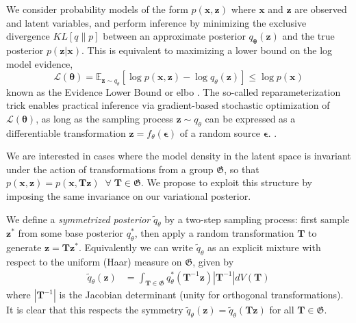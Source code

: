 \documentclass{article}
\newcommand{\E}{\mathbb{E}}
\newcommand{\G}{\mathfrak{G}}
\renewcommand{\v}[1]{\mathbf{#1}}
\newcommand{\elbo}{{\sc elbo}}
\begin{document}
We consider probability models of the form $p(\v{x}, \v{z})$ where $\v{x}$ and
$\v{z}$ are observed and latent variables, and perform
inference by minimizing the exclusive divergence $KL[q \| p]$
between an approximate posterior $q_{\v{\theta}}(\v{z})$ and the true
posterior $p(\v{z}|\v{x})$. This is equivalent to maximizing a lower
bound on the log model evidence,
\begin{equation}
\mathcal{L}(\v{\theta})\label{eqn:elbo} = \E_{\v{z}\sim q_\theta}\left[\log p(\v{x}, \v{z}) -
                \log q_\theta(\v{z})\right] \le \log p(\v{x}) 
\end{equation}
known as the Evidence Lower Bound or \elbo \; \citep{bishop2006pattern}. 
The so-called reparameterization trick enables practical inference via
gradient-based stochastic optimization of $\mathcal{L}(\v{\theta})$, as
long as the sampling process $\v{z}\sim q_\theta$ can be expressed as
a differentiable transformation $\v{z} = f_\theta(\v{\epsilon})$ of a random
source $\v{\epsilon}$. \citep{kingma2013auto, kucukelbir2016automatic}. 

We are interested in cases where the model density in the latent space is invariant under
the action of transformations from a group $\G$, so that 
$p(\v{x}, \v{z}) = p(\v{x}, \v{T}\v{z}) \;\; \forall \; \v{T} \in
\G.$
We propose to exploit this structure by imposing the same invariance
on our variational posterior. 

We define a {\em symmetrized
  posterior} $\tilde{q}_{\theta}$ by a two-step sampling
process: first sample $\v{z}^*$ from some base posterior $q_\theta^*$, then apply a random
transformation $\v{T}$ to generate $\v{z} =
\v{T}\v{z}^*$. Equivalently we can write $\tilde{q}_{\theta}$ as an
explicit mixture with respect to the uniform (Haar) measure on $\G$,
given by
\begin{align}
\tilde{q}_{\theta}(\v{z}) &= \int_{\v{T}\in \G}
                            q^*_{\theta}(\v{T}^{-1}\v{z})
                            \left|\v{T}^{-1}\right|dV(\v{T})
\end{align}
where $\left|\v{T}^{-1}\right|$ is the Jacobian
determinant (unity for orthogonal transformations). It is clear that this
respects the symmetry $\tilde{q}_\theta(\v{z})
=\tilde{q}_\theta(\v{T}\v{z})$ for all $\v{T}\in\G$. 
\end{document}
